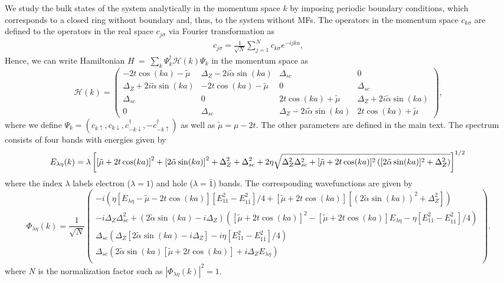 \documentclass[prl,twocolumn,showpacs,floatfix,amsbsy,amsbsy,superscriptaddress]{revtex4-1}
\begin{document}
We study the bulk states of the system analytically in the momentum space $k$ by imposing periodic boundary conditions, which corresponds to a closed ring without boundary and, thus, to the system without MFs. The operators in the momentum space $c_{k \sigma}$ are defined to the operators in the real space $    c_{j \sigma}$ via Fourier transformation as
\begin{align}
    c_{j \sigma}=\frac{1}{\sqrt{N}}\sum_{j=1}^N c_{k \sigma} e^{-ijka},
\end{align}
Hence, we can write Hamiltonian $H~=~\sum_k\Psi_k^\dag\mathcal H(k)\Psi_k$  in the momentum space as
\begin{equation*}
\mathcal H(k)=
\left( \begin{array}{cccc}
-2t\cos(ka)-\tilde{\mu} & \Delta_Z-2i\tilde{\alpha}\sin(ka) & \Delta_{sc} & 0\\
\Delta_Z+2i\tilde{\alpha}\sin(ka) & -2t\cos(ka)-\tilde{\mu} & 0 & \Delta_{sc}\\
\Delta_{sc} & 0 & 2t\cos(ka)+\tilde{\mu} & \Delta_Z+2i\tilde{\alpha}\sin(ka)\\
0 & \Delta_{sc} & \Delta_Z-2i\tilde{\alpha}\sin(ka) & 2t\cos(ka)+\tilde{\mu}
\end{array}\right),
\end{equation*}
where we define ${\Psi}_k=({c}_{k \uparrow}, {c}_{k \downarrow}, {c}_{-k \downarrow}^{\dag}, -{c}_{-k \uparrow}^\dag)$ as well as $\tilde \mu= \mu -2t$. The other parameters are defined in the main text. The spectrum consists of four bands with energies given by
\begin{equation}
 E_{\lambda\eta}(k)=\lambda\left[\left[\tilde{\mu}+2t\cos(ka)\right]^2+\left[2\tilde{\alpha}\sin(ka)\right]^2+\Delta_Z^2+\Delta_{sc}^2+2\eta\sqrt{\Delta_Z^2\Delta_{sc}^2+[\tilde{\mu}+2t\cos(ka)]^2\left( [2\tilde{\alpha}\sin(ka)]^2+\Delta_Z^2\right)}\right]^{1/2} \nonumber\\
\end{equation}
where the index $\lambda$ labels electron ($\lambda=1$) and hole ($\lambda=\bar 1$) bands. The corresponding wavefunctions are given by
\begin{equation*}
\Phi_{\lambda\eta}(k)=
\frac{1}{\sqrt{N}}
\left(
\begin{array}{c}
 -i(\eta[E_{\lambda\eta}-\tilde{\mu}-2t\cos(ka)][E_{11}^2-E_{1\bar{1}}^2]/4+[\tilde{\mu}+2t\cos(ka)][(2\tilde{\alpha}\sin(ka))^2+\Delta_Z^2])\\
 -i\Delta_Z\Delta_{sc}^2+(2\tilde{\alpha}\sin(ka)-i\Delta_Z)([\tilde{\mu}+2t\cos(ka)]^2-[\tilde{\mu}+2t\cos(ka)]E_{\lambda\eta}-\eta[E_{11}^2-E_{1\bar{1}}^2]/4) \\
\Delta_{sc}(\Delta_Z[2\tilde{\alpha}\sin(ka)-i\Delta_Z]-i\eta[E_{11}^2-E_{1\bar{1}}^2]/4)\\ 
 \Delta_{sc}(2\tilde{\alpha}\sin(ka)[\tilde{\mu}+2t\cos(ka)]+i\Delta_Z E_{\lambda\eta})\\
\end{array}
\right).
\end{equation*}
where $N$ is the normalization factor such as $|\Phi_{\lambda\eta}(k)|^2=1$.
\end{document}

